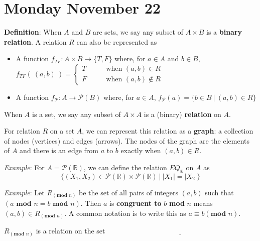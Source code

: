 \documentclass[12pt, oneside]{article}
\begin{document}
\begin{flushright}
\end{flushright} 
\section*{Monday November 22}



{\bf Definition}: When $A$ and $B$ are sets, we say any subset of $A \times B$ is a {\bf binary relation}. 
A relation $R$ can also be represented as

\begin{itemize}
\item A function $f_{TF} : A \times B \to \{T, F\}$
where, for $a \in A$ and $b \in B$, $f_{TF}(~(a,b)~) = 
\begin{cases} 
    T \qquad&\text{when } (a,b) \in R \\
    F \qquad&\text{when } (a,b) \notin R
\end{cases}$
\item A function $f_{\mathcal{P}} : A   \to \mathcal{P}(B)$ where, for $a \in A$, 
$f_{\mathcal{P}}( a ) = \{ b \in B ~|~ (a,b) \in R \}$
\end{itemize}

When $A$ is a set, we say any subset of $A \times A$ is a (binary) {\bf relation} on $A$.

 

For relation $R$ on a set $A$, we can represent this relation as a
{\bf graph}: a collection of nodes (vertices) and edges (arrows). The 
nodes of the graph are the elements of $A$ and 
there is an edge from $a$ to $b$ exactly when $(a,b) \in R$.

\vspace{100pt} 

{\it Example}: For $A = \mathcal{P}(\mathbb{R})$, we can define the relation $EQ_{\mathbb{R}}$ on $A$ as 
\[
\{ (X_1, X_2 ) \in\mathcal{P}(\mathbb{R})  \times \mathcal{P}(\mathbb{R}) ~|~ |X_1| = |X_2| \}
\]

\vspace{50pt}

{\it Example}: Let $R_{(\textbf{mod } n)}$ be the set of all pairs of integers $(a, b)$ such that $(a \textbf{ mod } n = b \textbf{ mod } n)$.
Then $a$ is {\bf congruent to} $b$ \textbf{mod} $n$ means $(a, b) \in R_{(\textbf{mod } n)}$. A common notation is to write this as $a \equiv b (\textbf{mod } n)$.


$R_{(\textbf{mod } n)}$ is a relation on the set $\underline{\phantom{\mathbb{Z}}\hspace{20em}}$
\end{document}
